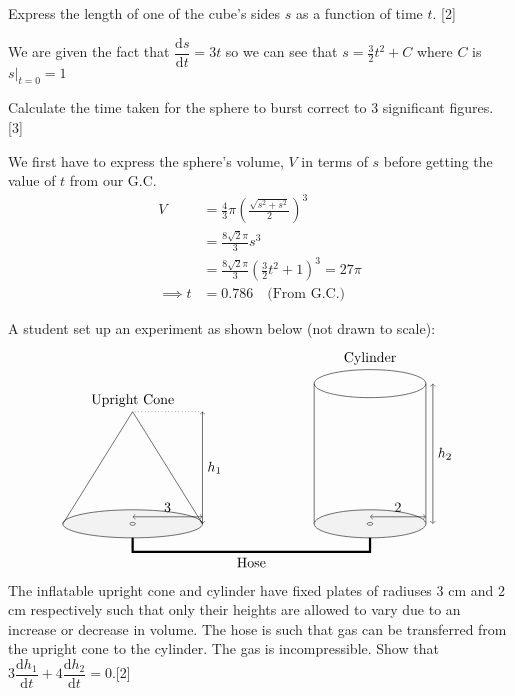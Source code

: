 \documentclass[12pt, a4 paper]{article}
\begin{document}
\begin{outline}[enumerate]
  \2 Express the length of one of the cube's sides $s$ as a function of time $t$. \hfill[2]
  \begin{answer}
    We are given the fact that $\dfrac{\mathrm{d}s}{\mathrm{d}t}=3t$ so we can see that $s=\frac{3}{2}t^2+C$ where $C$ is $s|_{t=0}=1$
  \end{answer}

  \2 Calculate the time taken for the sphere to burst correct to 3 significant figures. \hfill[3]
  \begin{answer}
    We first have to express the sphere's volume, $V$ in terms of $s$ before getting the value of $t$ from our G.C.
    \begin{align*}
      V &= \frac{4}{3}\pi \left(\frac{\sqrt{s^2+s^2}}{2}\right)^3 \\
      &= \frac{8\sqrt2\pi}{3}s^3 \\
      &= \frac{8\sqrt2\pi}{3}\left(\frac{3}{2}t^2+1\right)^3 = 27\pi \\
      \implies t &= 0.786 \quad\textrm{(From G.C.)}\quad
    \end{align*}
  \end{answer}

 \1 A student set up an experiment as shown below (not drawn to scale):
 \[
 \begin{tikzpicture}
   \filldraw[color=white!90!gray,draw=black] (0,0) ellipse (50pt and 10pt);
   \draw[<->](0,5pt) -- (25pt,5pt) node[above]{3} --   (50pt,5pt);
   \draw[<->](50pt,0pt) -- (50pt,40pt) node[right]{$h_{1}$} --   (50pt,80pt);
   \draw[dotted](50pt,80pt) -- (0,80pt);
   \draw (-50pt,0) -- (0,80pt) node[above]{Upright Cone} -- (50pt,0);
   \draw (130pt,0) -- (130pt,100pt);
   \draw (210pt,0) -- (210pt,100pt);
   \filldraw[color=white!90!gray,draw=black] (170pt,0) ellipse (40pt and 10pt);
   \draw[<->](170pt,5pt) -- (190pt,5pt) node[above]{2} --   (210pt,5pt);
   \draw[<->](215pt,0pt) -- (215pt,50pt) node[right]{$h_{2}$} --   (215pt,100pt);
   \draw (170pt, 110pt) node[above] {Cylinder};
   \draw (170pt,100pt) ellipse (40pt and 10pt);
   \draw[ultra thick] (0,-10pt) -- (0,-20pt) -- (85pt,-20pt) node[below]{Hose} -- (170pt,-20pt) -- (170pt, -10pt);
   \filldraw[color=white,draw=black] (0,0) ellipse (2pt and 1pt);
   \filldraw[color=white,draw=black] (170pt,0) ellipse (2pt and 1pt);
 \end{tikzpicture}
 \]
 The inflatable upright cone and cylinder have fixed plates of radiuses 3 cm and 2 cm  respectively such that only their heights are allowed to vary due to an increase or decrease in volume. The hose is such that gas can be transferred from the upright cone to the cylinder. The gas is incompressible. %
 \2 Show that $3\dfrac{\mathrm{d}h_{1}}{\mathrm{d}t}+4\dfrac{\mathrm{d}h_{2}}{\mathrm{d}t}=0$.\hfill[2]


\end{outline}
\end{document}
